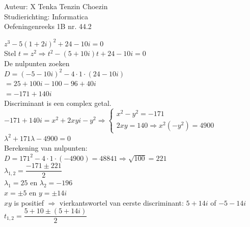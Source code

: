 \documentclass[a4paper]{article}
\begin{document}
  
\noindent \large Auteur: X Tenka Tenzin Choezin \\
\noindent \large Studierichting: Informatica\\
\noindent \large Oefeningenreeks 1B nr. 44.2\\

\medskip

\normalsize

 $z^3 - 5(1 + 2i)^2 + 24 - 10i = 0$ \\

Stel $t = z^2 \Rightarrow t^2 - (5 + 10i)t + 24 - 10i = 0$ \\

De nulpunten zoeken\\

$D = (-5 - 10i)^2 - 4 \cdot 1 \cdot (24 - 10i)$\\

$ = 25 + 100i - 100 - 96 + 40i $\\

$ = -171 + 140i $ \\

Discriminant is een complex getal. \\

$ -171 + 140i = x^2 + 2xyi - y^2 \Rightarrow \left\{
\begin{array}{l}
	x^2 - y^2 = -171 \\
	2xy = 140 \Rightarrow x^2(-y^2) = 4900
\end{array}
\right . $\\

$ \lambda^2 + 171\lambda -4900 = 0$\\

Berekening van nulpunten:\\

$D = 171^2 - 4 \cdot 1 \cdot (-4900) = 48841 \Rightarrow \sqrt{100} = 221$\\

$\lambda_{1,2} = \dfrac{-171 \pm 221}{2} $\\

$\lambda_{1} = 25$ en $\lambda_{2} = -196$\\

$x = \pm 5$ en $y = \pm 14i $\\

$xy$ is positief $\Rightarrow$ vierkantswortel van eerste discriminant: $5 + 14i$ of $-5 - 14i$ \\

$t_{1,2} = \dfrac{5+10 \pm (5 + 14i)}{2}$\\
\end{document}
